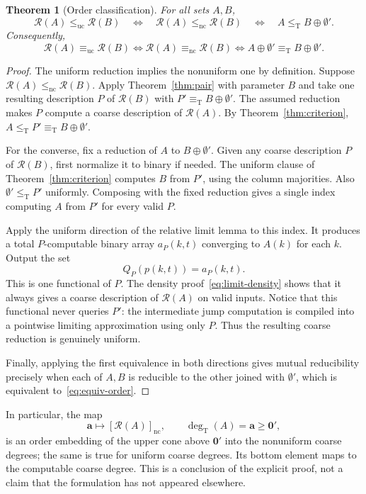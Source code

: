 \documentclass[11pt,a4paper]{article}
\newcommand{\leT}{\leq_{\mathrm T}}
\newcommand{\eqT}{\equiv_{\mathrm T}}
\newcommand{\leuc}{\leq_{\mathrm{uc}}}
\newcommand{\lenc}{\leq_{\mathrm{nc}}}
\newcommand{\equc}{\equiv_{\mathrm{uc}}}
\newcommand{\eqnc}{\equiv_{\mathrm{nc}}}
\newcommand{\degT}{\operatorname{deg}_{\mathrm T}}
\newcommand{\R}{\mathcal R}
\newcommand{\zero}{\mathbf 0}
\newtheorem{theorem}{Theorem}[section]
\theoremstyle{definition}\newtheorem{definition}[theorem]{Definition}
\theoremstyle{remark}\newtheorem{remark}[theorem]{Remark}
\begin{document}
\begin{theorem}[Order classification]\label{thm:order}
For all sets $A,B$,
\begin{equation}
 \R(A)\leuc\R(B)
 \quad\Longleftrightarrow\quad
 \R(A)\lenc\R(B)
 \quad\Longleftrightarrow\quad
 A\leT B\oplus\emptyset'.
 \label{eq:order}
\end{equation}
Consequently,
\begin{equation}
 \R(A)\equc\R(B)
 \Longleftrightarrow\R(A)\eqnc\R(B)
 \Longleftrightarrow A\oplus\emptyset'\eqT B\oplus\emptyset'.
 \label{eq:equiv-order}
\end{equation}
\end{theorem}
\begin{proof}
The uniform reduction implies the nonuniform one by definition. Suppose $\R(A)\lenc\R(B)$. Apply Theorem~\ref{thm:pair} with parameter $B$ and take one resulting description $P$ of $\R(B)$ with $P'\eqT B\oplus\emptyset'$. The assumed reduction makes $P$ compute a coarse description of $\R(A)$. By Theorem~\ref{thm:criterion}, $A\leT P'\eqT B\oplus\emptyset'$.

For the converse, fix a reduction of $A$ to $B\oplus\emptyset'$. Given any coarse description $P$ of $\R(B)$, first normalize it to binary if needed. The uniform clause of Theorem~\ref{thm:criterion} computes $B$ from $P'$, using the column majorities. Also $\emptyset'\leT P'$ uniformly. Composing with the fixed reduction gives a single index computing $A$ from $P'$ for every valid $P$.

Apply the uniform direction of the relative limit lemma to this index. It produces a total $P$-computable binary array $a_P(k,t)$ converging to $A(k)$ for each $k$. Output the set
\[
 Q_P(p(k,t))=a_P(k,t).
\]
This is one functional of $P$. The density proof~\eqref{eq:limit-density} shows that it always gives a coarse description of $\R(A)$ on valid inputs. Notice that this functional never queries $P'$: the intermediate jump computation is compiled into a pointwise limiting approximation using only $P$. Thus the resulting coarse reduction is genuinely uniform.

Finally, applying the first equivalence in both directions gives mutual reducibility precisely when each of $A,B$ is reducible to the other joined with $\emptyset'$, which is equivalent to~\eqref{eq:equiv-order}.
\end{proof}

In particular, the map
\[
 \mathbf a\longmapsto[\R(A)]_{\mathrm{nc}},\qquad
 \degT(A)=\mathbf a\geq\zero',
\]
is an order embedding of the upper cone above $\zero'$ into the nonuniform coarse degrees; the same is true for uniform coarse degrees. Its bottom element maps to the computable coarse degree. This is a conclusion of the explicit proof, not a claim that the formulation has not appeared elsewhere.
\end{document}
